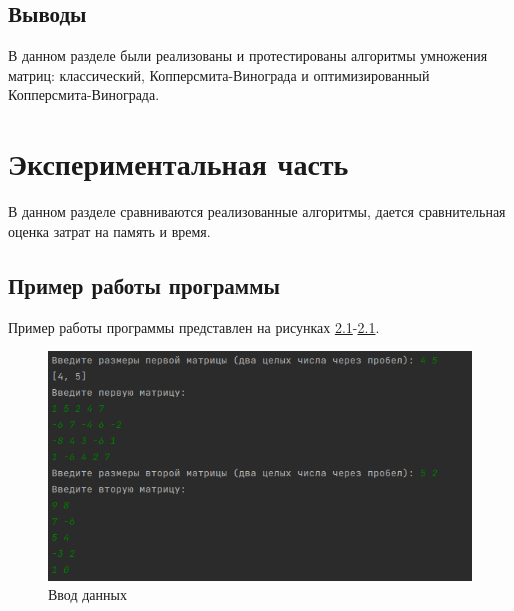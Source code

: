 \documentclass[a4paper,oneside,14pt]{extreport}
\begin{document}
\section{Выводы}
В данном разделе были реализованы и протестированы алгоритмы умножения матриц: классический, Копперсмита-Винограда и оптимизированный Копперсмита-Винограда.
\newpage

\chapter{Экспериментальная часть}
В данном разделе сравниваются реализованные алгоритмы, дается сравнительная оценка затрат на память и время.

\section{Пример работы программы}
Пример работы программы представлен на рисунках \ref{fig:work_example1}-\ref{fig:work_example1}.
\captionsetup{singlelinecheck=true}
\begin{figure}[H]
	\centering
	\includegraphics[width=0.7\linewidth]{images/example1}
	\caption{Ввод данных}
	\label{fig:work_example1}
\end{figure}
\end{document}
